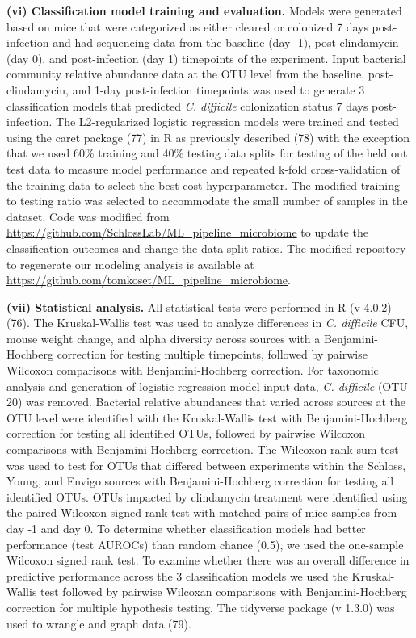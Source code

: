 \documentclass[
  11pt,
]{article}
\begin{document}
\textbf{(vi) Classification model training and evaluation.} Models were
generated based on mice that were categorized as either cleared or
colonized 7 days post-infection and had sequencing data from the
baseline (day -1), post-clindamycin (day 0), and post-infection (day 1)
timepoints of the experiment. Input bacterial community relative
abundance data at the OTU level from the baseline, post-clindamycin, and
1-day post-infection timepoints was used to generate 3 classification
models that predicted \emph{C. difficile} colonization status 7 days
post-infection. The L2-regularized logistic regression models were
trained and tested using the caret package (77) in R as previously
described (78) with the exception that we used 60\% training and 40\%
testing data splits for testing of the held out test data to measure
model performance and repeated k-fold cross-validation of the training
data to select the best cost hyperparameter. The modified training to
testing ratio was selected to accommodate the small number of samples in
the dataset. Code was modified from
\url{https://github.com/SchlossLab/ML_pipeline_microbiome} to update the
classification outcomes and change the data split ratios. The modified
repository to regenerate our modeling analysis is available at
\url{https://github.com/tomkoset/ML_pipeline_microbiome}.

\textbf{(vii) Statistical analysis.} All statistical tests were
performed in R (v 4.0.2) (76). The Kruskal-Wallis test was used to
analyze differences in \emph{C. difficile} CFU, mouse weight change, and
alpha diversity across sources with a Benjamini-Hochberg correction for
testing multiple timepoints, followed by pairwise Wilcoxon comparisons
with Benjamini-Hochberg correction. For taxonomic analysis and
generation of logistic regression model input data, \emph{C. difficile}
(OTU 20) was removed. Bacterial relative abundances that varied across
sources at the OTU level were identified with the Kruskal-Wallis test
with Benjamini-Hochberg correction for testing all identified OTUs,
followed by pairwise Wilcoxon comparisons with Benjamini-Hochberg
correction. The Wilcoxon rank sum test was used to test for OTUs that
differed between experiments within the Schloss, Young, and Envigo
sources with Benjamini-Hochberg correction for testing all identified
OTUs. OTUs impacted by clindamycin treatment were identified using the
paired Wilcoxon signed rank test with matched pairs of mice samples from
day -1 and day 0. To determine whether classification models had better
performance (test AUROCs) than random chance (0.5), we used the
one-sample Wilcoxon signed rank test. To examine whether there was an
overall difference in predictive performance across the 3 classification
models we used the Kruskal-Wallis test followed by pairwise Wilcoxan
comparisons with Benjamini-Hochberg correction for multiple hypothesis
testing. The tidyverse package (v 1.3.0) was used to wrangle and graph
data (79).
\end{document}
